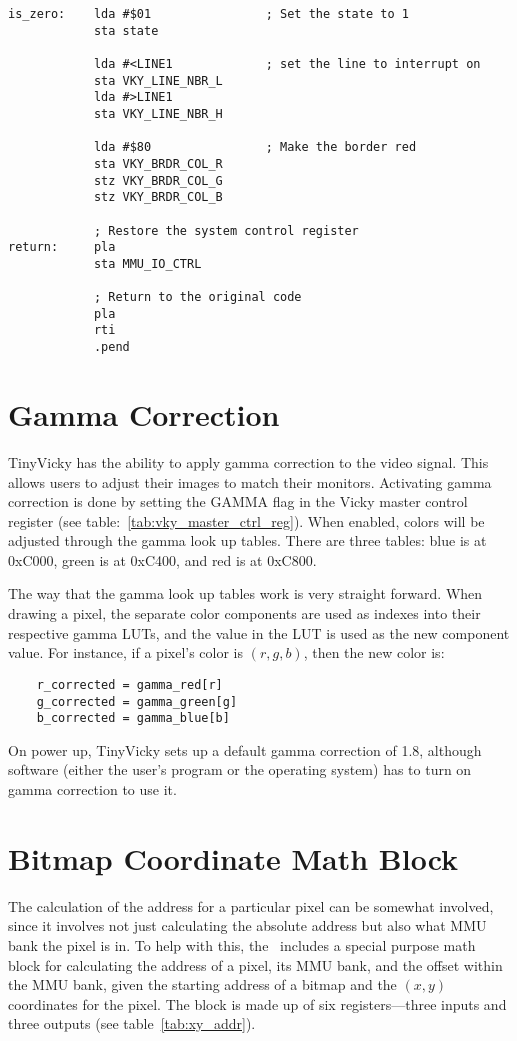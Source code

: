 \begin{verbatim}
is_zero:    lda #$01                ; Set the state to 1
            sta state

            lda #<LINE1             ; set the line to interrupt on
            sta VKY_LINE_NBR_L
            lda #>LINE1
            sta VKY_LINE_NBR_H

            lda #$80                ; Make the border red
            sta VKY_BRDR_COL_R
            stz VKY_BRDR_COL_G
            stz VKY_BRDR_COL_B

            ; Restore the system control register
return:     pla
            sta MMU_IO_CTRL

            ; Return to the original code
            pla
            rti
            .pend
\end{verbatim}

\section*{Gamma Correction}
\label{sec:gamma}

TinyVicky has the ability to apply gamma correction to the video signal. This allows users to adjust their images to match their monitors. Activating gamma correction is done by setting the GAMMA flag in the Vicky master control register (see table:~\ref{tab:vky_master_ctrl_reg}). When enabled, colors will be adjusted through the gamma look up tables. There are three tables: blue is at 0xC000, green is at 0xC400, and red is at 0xC800.

The way that the gamma look up tables work is very straight forward. When drawing a pixel, the separate color components are used as indexes into their respective gamma LUTs, and the value in the LUT is used as the new component value. For instance, if a pixel's color is $(r, g, b)$, then the new color is:
\begin{verbatim}
    r_corrected = gamma_red[r]
    g_corrected = gamma_green[g]
    b_corrected = gamma_blue[b]
\end{verbatim}

On power up, TinyVicky sets up a default gamma correction of 1.8, although software (either the user's program or the operating system) has to turn on gamma correction to use it.

\section*{Bitmap Coordinate Math Block}

The calculation of the address for a particular pixel can be somewhat involved, since it involves not just calculating the absolute address but also what MMU bank the pixel is in. To help with this, the \jr\ includes a special purpose math block for calculating the address of a pixel, its MMU bank, and the offset within the MMU bank, given the starting address of a bitmap and the $(x, y)$ coordinates for the pixel. The block is made up of six registers---three inputs and three outputs (see table~\ref{tab:xy_addr}).

